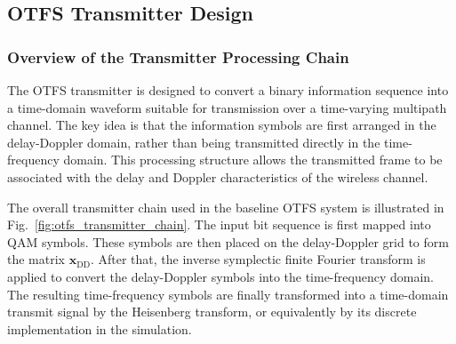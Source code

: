 \subsection{OTFS Transmitter Design}

\subsubsection{Overview of the Transmitter Processing Chain}

The OTFS transmitter is designed to convert a binary information sequence into a time-domain waveform suitable for transmission over a time-varying multipath channel. The key idea is that the information symbols are first arranged in the delay-Doppler domain, rather than being transmitted directly in the time-frequency domain. This processing structure allows the transmitted frame to be associated with the delay and Doppler characteristics of the wireless channel.

The overall transmitter chain used in the baseline OTFS system is illustrated in Fig.~\ref{fig:otfs_transmitter_chain}. The input bit sequence is first mapped into QAM symbols. These symbols are then placed on the delay-Doppler grid to form the matrix \(\mathbf{x}_{\mathrm{DD}}\). After that, the inverse symplectic finite Fourier transform is applied to convert the delay-Doppler symbols into the time-frequency domain. The resulting time-frequency symbols are finally transformed into a time-domain transmit signal by the Heisenberg transform, or equivalently by its discrete implementation in the simulation.

